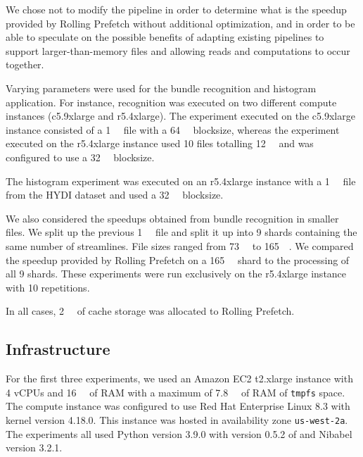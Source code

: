 We chose not to modify the pipeline in order to determine what is the speedup provided
by Rolling Prefetch without additional optimization, and in order to be able to speculate on the possible benefits of adapting existing pipelines
to support larger-than-memory files and allowing reads and computations to occur together.

Varying parameters were used for the bundle recognition and
histogram application. For instance, recognition was
executed on two different compute instances (c5.9xlarge and r5.4xlarge). The experiment executed on the c5.9xlarge instance consisted of a \SI{1}{\gibi\byte} file with a \SI{64}{\mebi\byte} blocksize,
whereas the experiment executed on the r5.4xlarge instance used 10 files totalling \SI{12}{\gibi\byte} and was configured to use a \SI{32}{\mebi\byte} blocksize. 

The histogram experiment was executed on an r5.4xlarge instance with a \SI{1}{\gibi\byte} file from the HYDI dataset and used a \SI{32}{\mebi\byte} blocksize.

We also considered the speedups obtained from
bundle recognition in smaller files. We split up the 
previous \SI{1}{\gibi\byte} file and split it up into
9 shards containing the same number of streamlines. File sizes ranged from \SI{73}{\mebi\byte} to \SI{165}{\mebi\byte}. We compared the speedup provided by Rolling Prefetch on a \SI{165}{\mebi\byte} shard to
the processing of all 9 shards. These experiments were
run exclusively on the r5.4xlarge instance with 10 repetitions.


In all cases, \SI{2}{\gibi\byte} of cache storage was allocated to Rolling Prefetch.

\subsection{Infrastructure}

For the first three experiments, we used an Amazon EC2 t2.xlarge instance with 4 vCPUs and \SI{16}{\gibi\byte} of RAM with a
maximum of \SI{7.8}{\gibi\byte} of RAM of \texttt{tmpfs} space. The compute instance was configured to use Red Hat Enterprise
Linux 8.3 with kernel version 4.18.0. This instance was hosted in availability zone \texttt{us-west-2a}.
The experiments all used Python version 3.9.0 with version 0.5.2 of \sfs and Nibabel version 3.2.1.

